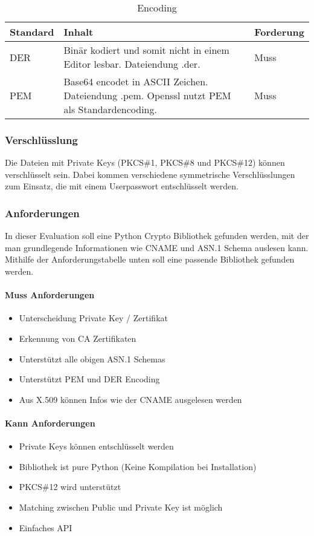 \begin{table}[H]
\centering
    \begin{tabular}{|l|p{12cm}|l|}
    \hline
    \rowcolor{lightblue}
    Standard & Inhalt & Forderung   \\ \hline
	DER	&	Binär kodiert und somit nicht in einem Editor lesbar. Dateiendung .der.	& Muss \\ \hline	
		PEM	&	
Base64 encodet in ASCII Zeichen. Dateiendung .pem. Openssl nutzt PEM als Standardencoding.	& Muss \\ \hline		
	\end{tabular}
    \caption[Encoding]{Encoding}
\end{table}

\subsubsection{Verschlüsslung}
Die Dateien mit Private Keys (PKCS\#1, PKCS\#8 und PKCS\#12) können verschlüsselt sein. Dabei kommen verschiedene symmetrische Verschlüsslungen zum Einsatz, die mit einem Userpasswort entschlüsselt werden.


\subsubsection{Anforderungen}
In dieser Evaluation soll eine Python Crypto Bibliothek gefunden werden, mit der man grundlegende Informationen wie CNAME und ASN.1 Schema auslesen kann. Mithilfe der Anforderungstabelle unten soll eine passende Bibliothek gefunden werden.

\paragraph{Muss Anforderungen}
\begin{itemize}
	\item Unterscheidung Private Key / Zertifikat
	\item Erkennung von CA Zertifikaten
	\item Unterstützt alle obigen ASN.1 Schemas
	\item Unterstützt PEM und DER Encoding
	\item Aus X.509 können Infos wie der CNAME ausgelesen werden	
\end{itemize}

\paragraph{Kann Anforderungen}
\begin{itemize}
	\item Private Keys können entschlüsselt werden	
	\item Bibliothek ist pure Python (Keine Kompilation bei Installation)
	\item PKCS\#12 wird unterstützt
	\item Matching zwischen Public und Private Key ist möglich
	\item Einfaches API
\end{itemize}

